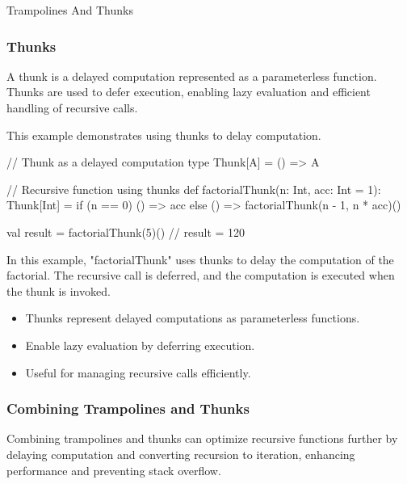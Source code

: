 \begin{notes}{Trampolines And Thunks}
\begin{highlight}[Trampolines]
    \end{highlight}
    
    \subsubsection*{Thunks}
    
    A thunk is a delayed computation represented as a parameterless function. Thunks are used to defer execution, enabling lazy evaluation and efficient handling of recursive calls.
    
    \begin{highlight}[Thunks]
    
        This example demonstrates using thunks to delay computation.
    
    \begin{code}[Scala]
    // Thunk as a delayed computation
    type Thunk[A] = () => A
    
    // Recursive function using thunks
    def factorialThunk(n: Int, acc: Int = 1): Thunk[Int] =
        if (n == 0) () => acc
        else () => factorialThunk(n - 1, n * acc)()
    
    val result = factorialThunk(5)()  // result = 120
    \end{code}
    
        In this example, "factorialThunk" uses thunks to delay the computation of the factorial. The recursive call is deferred, and the computation is executed when the thunk is invoked.
    
        \begin{itemize}
            \item Thunks represent delayed computations as parameterless functions.
            \item Enable lazy evaluation by deferring execution.
            \item Useful for managing recursive calls efficiently.
        \end{itemize}
    
    \end{highlight}
    
    \subsubsection*{Combining Trampolines and Thunks}
    
    Combining trampolines and thunks can optimize recursive functions further by delaying computation and converting recursion to iteration, enhancing performance and preventing stack overflow.
    

\end{notes}
